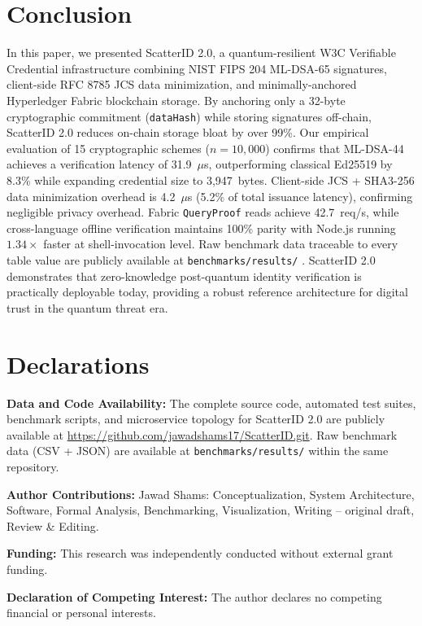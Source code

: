 \documentclass[5p,times,authoryear]{elsarticle}
\begin{document}
\section{Conclusion}
In this paper, we presented ScatterID 2.0, a quantum-resilient W3C Verifiable Credential infrastructure combining NIST FIPS 204 ML-DSA-65 signatures, client-side RFC 8785 JCS \cite{rfc8785} data minimization, and minimally-anchored Hyperledger Fabric blockchain storage. By anchoring only a 32-byte cryptographic commitment (\texttt{dataHash}) while storing signatures off-chain, ScatterID 2.0 reduces on-chain storage bloat by over 99\%. Our empirical evaluation of 15 cryptographic schemes ($n = 10{,}000$) confirms that ML-DSA-44 achieves a verification latency of 31.9~$\mu$s, outperforming classical Ed25519 by 8.3\% while expanding credential size to 3,947~bytes. Client-side JCS + SHA3-256 data minimization overhead is 4.2~$\mu$s (5.2\% of total issuance latency), confirming negligible privacy overhead. Fabric \texttt{QueryProof} reads achieve 42.7~req/s, while cross-language offline verification maintains 100\% parity with Node.js running $1.34\times$ faster at shell-invocation level. Raw benchmark data traceable to every table value are publicly available at \texttt{benchmarks/results/} \cite{shams2026benchmarks}. ScatterID 2.0 demonstrates that zero-knowledge post-quantum identity verification is practically deployable today, providing a robust reference architecture for digital trust in the quantum threat era.

\section*{Declarations}
\textbf{Data and Code Availability:} The complete source code, automated test suites, benchmark scripts, and microservice topology for ScatterID 2.0 are publicly available at \url{https://github.com/jawadshams17/ScatterID.git}. Raw benchmark data (CSV + JSON) are available at \texttt{benchmarks/results/} within the same repository.

\textbf{Author Contributions:} Jawad Shams: Conceptualization, System Architecture, Software, Formal Analysis, Benchmarking, Visualization, Writing -- original draft, Review \& Editing.

\textbf{Funding:} This research was independently conducted without external grant funding.

\textbf{Declaration of Competing Interest:} The author declares no competing financial or personal interests.



\end{document}
